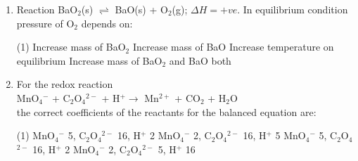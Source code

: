 \documentclass[twocolumn]{article}
\begin{document}
\begin{enumerate}
    \item Reaction BaO$_2$(s) $\rightleftharpoons$ BaO(s) + O$_2$(g); $\Delta H = +ve$. In equilibrium condition pressure of O$_2$ depends on:
    \begin{tasks}(1)
        \task Increase mass of BaO$_2$
        \task Increase mass of BaO
        \task Increase temperature on equilibrium
        \task Increase mass of BaO$_2$ and BaO both
    \end{tasks}
    
    \item For the redox reaction \\
    MnO$_4$$^-$ + C$_2$O$_4$$^{2-}$ + H$^+ \rightarrow$ Mn$^{2+}$ + CO$_2$ + H$_2$O \\
    the correct coefficients of the reactants for the balanced equation are:
    \begin{tasks}(1)
        \task MnO$_4$$^-$ 5, C$_2$O$_4$$^{2-}$ 16, H$^+$ 2
        \task MnO$_4$$^-$ 2, C$_2$O$_4$$^{2-}$ 16, H$^+$ 5
        \task MnO$_4$$^-$ 5, C$_2$O$_4$$^{2-}$ 16, H$^+$ 2
        \task MnO$_4$$^-$ 2, C$_2$O$_4$$^{2-}$ 5, H$^+$ 16
    \end{tasks}


\end{enumerate}
\end{document}
